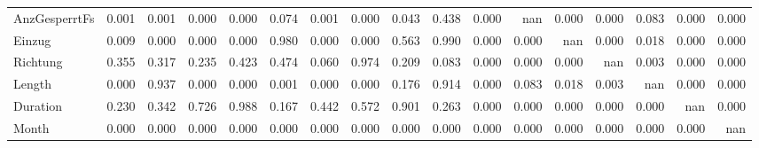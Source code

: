\begin{tabular}{lrrrrrrrrrrrrrrrr}
AnzGesperrtFs &    0.001 &    0.001 &    0.000 &    0.000 &     0.074 &     0.001 &     0.000 &  0.043 &  0.438 &    0.000 &            nan &   0.000 &     0.000 &   0.083 &     0.000 &  0.000 \\
Einzug        &    0.009 &    0.000 &    0.000 &    0.000 &     0.980 &     0.000 &     0.000 &  0.563 &  0.990 &    0.000 &          0.000 &     nan &     0.000 &   0.018 &     0.000 &  0.000 \\
Richtung      &    0.355 &    0.317 &    0.235 &    0.423 &     0.474 &     0.060 &     0.974 &  0.209 &  0.083 &    0.000 &          0.000 &   0.000 &       nan &   0.003 &     0.000 &  0.000 \\
Length        &    0.000 &    0.937 &    0.000 &    0.000 &     0.001 &     0.000 &     0.000 &  0.176 &  0.914 &    0.000 &          0.083 &   0.018 &     0.003 &     nan &     0.000 &  0.000 \\
Duration      &    0.230 &    0.342 &    0.726 &    0.988 &     0.167 &     0.442 &     0.572 &  0.901 &  0.263 &    0.000 &          0.000 &   0.000 &     0.000 &   0.000 &       nan &  0.000 \\
Month         &    0.000 &    0.000 &    0.000 &    0.000 &     0.000 &     0.000 &     0.000 &  0.000 &  0.000 &    0.000 &          0.000 &   0.000 &     0.000 &   0.000 &     0.000 &    nan \\
\bottomrule
\end{tabular}
